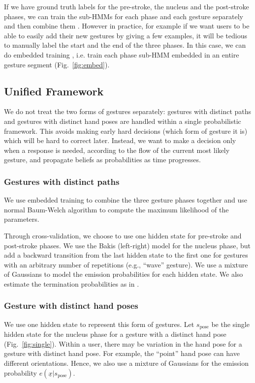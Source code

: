 If we have ground truth labels for the pre-stroke, the nucleus and the
post-stroke phases, we can train the sub-HMMs for each phase and each gesture
separately and then combine them \cite{yin13}. However in practice, for example
if we want users to be able to easily add their new gestures by giving a few
examples, it will be tedious to manually label the start and the end of the
three phases. In this case, we can do embedded training \cite{young1994}, i.e.
train each phase sub-HMM embedded in an entire gesture segment
(Fig.~\ref{fig:embed}).

\subsection{Unified Framework}\label{sec:unified}
We do not treat the two forms of gestures separately: gestures with
distinct paths and gestures with distinct hand poses are handled within a
single probabilistic framework. This avoids making early hard decisions (which
form of gesture it is) which will be hard to correct later. Instead, we want to
make a decision only when a response is needed, according to the flow of the
current most likely gesture, and propagate beliefs as probabilities as time progresses.

\subsubsection{Gestures with distinct paths}
We use embedded training to
combine the three gesture phases together and use normal Baum-Welch algorithm to compute the
maximum likelihood of the parameters. 

Through cross-validation, we choose to use one hidden state for pre-stroke and
post-stroke phases. We use the Bakis (left-right) model \cite{Bauer00} for the
nucleus phase, but add a backward transition from the last hidden state to the first
one for gestures with an arbitrary number of repetitions (e.g., ``wave''
gesture). We use a mixture of Gaussians to model the emission probabilities for
each hidden state. We also estimate the termination
probabilities as in \cite{yin13}.

\subsubsection{Gesture with distinct hand poses}
We use one hidden state to represent this form of gestures. Let
$s_{\text{pose}}$ be the single hidden state for the nucleus phase for a gesture
with a distinct hand pose (Fig.~\ref{fig:single}). 
 Within a user,
there may be variation in the hand pose for a gesture with distinct hand pose. For example, the ``point'' hand pose can have different orientations. 
Hence, we also use a mixture of Gaussians for the emission probability
$e(\underline{x} | s_\text{pose})$.


